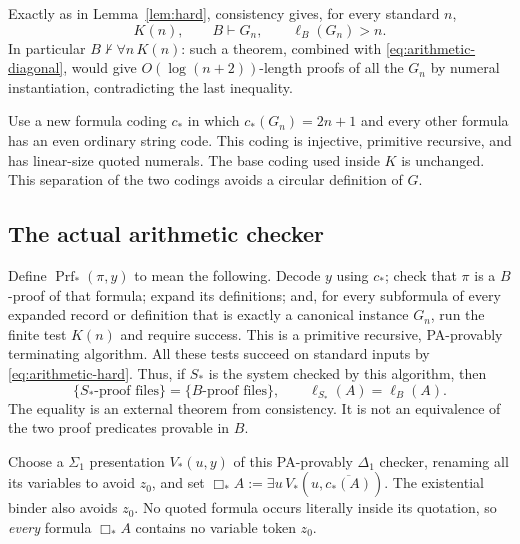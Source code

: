 \documentclass[11pt]{article}
\theoremstyle{remark}
\newcommand{\Prf}{\operatorname{Prf}}
\newcommand{\num}[1]{\overline{#1}}
\begin{document}
Exactly as in Lemma~\ref{lem:hard}, consistency gives, for every standard $n$,
\begin{equation}\label{eq:arithmetic-hard}
 K(n),\qquad B\vdash G_n,\qquad \ell_B(G_n)>n.
\end{equation}
In particular $B\nvdash\forall n\,K(n)$: such a theorem, combined with
\eqref{eq:arithmetic-diagonal}, would give $O(\log(n+2))$-length proofs of
all the $G_n$ by numeral instantiation, contradicting the last inequality.

Use a new formula coding $c_*$ in which $c_*(G_n)=2n+1$ and every other
formula has an even ordinary string code. This coding is injective, primitive
recursive, and has linear-size quoted numerals. The base coding used inside
$K$ is unchanged. This separation of the two codings avoids a circular
definition of $G$.

\subsection{The actual arithmetic checker}

Define $\Prf_*(\pi,y)$ to mean the following. Decode $y$ using $c_*$; check
that $\pi$ is a $B$-proof of that formula; expand its definitions; and, for
every subformula of every expanded record or definition that is exactly a
canonical instance $G_n$, run the finite test $K(n)$ and require success.
This is a primitive recursive, PA-provably terminating algorithm. All these
tests succeed on standard inputs by \eqref{eq:arithmetic-hard}. Thus, if
$S_*$ is the system checked by this algorithm, then
\begin{equation}\label{eq:identical-files}
 \{\text{$S_*$-proof files}\}=\{\text{$B$-proof files}\},\qquad
 \ell_{S_*}(A)=\ell_B(A).
\end{equation}
The equality is an external theorem from consistency. It is not an
equivalence of the two proof predicates provable in $B$.

Choose a $\Sigma_1$ presentation $V_*(u,y)$ of this PA-provably $\Delta_1$
checker, renaming all its variables to avoid $z_0$, and set
$\Box_*A:=\exists u\,V_*(u,\num{c_*(A)})$. The existential binder also
avoids $z_0$. No quoted formula occurs literally inside its quotation, so
\emph{every} formula $\Box_*A$ contains no variable token $z_0$.
\end{document}
